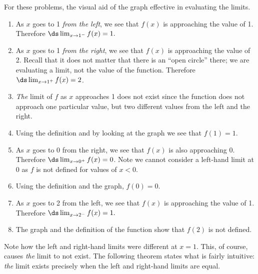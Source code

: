 \begin{solution}
{For these problems, the visual aid of the graph effective in evaluating the limits.
			\begin{enumerate}
			\item		As $x$ goes to 1 \textit{from the left}, we see that $f(x)$ is approaching the value of 1. Therefore $\ds \lim_{x\to 1^-} f(x) =1.$
			\item		As $x$ goes to 1 \textit{from the right}, we see that $f(x)$ is approaching the value of 2. Recall that it does not matter that there is an ``open circle'' there; we are evaluating a limit, not the value of the function. Therefore $\ds \lim_{x\to 1^+} f(x)=2$.
			\item		\textit{The} limit of $f$ as $x$ approaches 1 does not exist since the function does not approach one particular value, but two different values from the left and the right.
			\item		Using the definition and by looking at the graph we see that $f(1) = 1$.
			\item		As $x$ goes to 0 from the right, we see that $f(x)$ is also approaching 0. Therefore $\ds \lim_{x\to 0^+} f(x)=0$. Note we cannot consider a left-hand limit at 0 as $f$ is not defined for values of $x<0$.
			\item		Using the definition and the graph, $f(0) = 0$.
			\item		As $x$ goes to 2 from the left, we see that $f(x)$ is approaching the value of 1. Therefore $\ds \lim_{x\to 2^-} f(x)=1.$
			\item		The graph and the definition of the function show that $f(2)$ is not defined.
			\end{enumerate}
}
\end{solution}








Note how the left and right-hand limits were different at $x=1$. This, of course, causes \textit{the} limit to not exist. The following theorem states what is fairly intuitive: \textit{the} limit exists precisely when the left and right-hand limits are equal.


